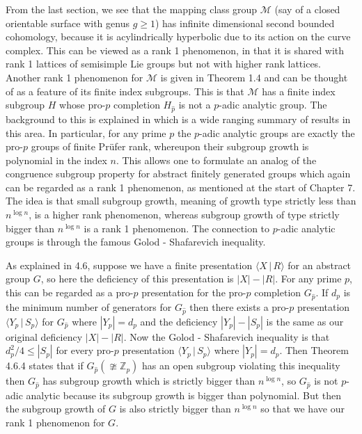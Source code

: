 \documentclass[11pt,reqno]{amsart}
\numberwithin{equation}{section}
\newcommand{\Z}{\mathbb{Z}}
\newcommand{\geqs}{\geqslant}
\theoremstyle{definition}
\theoremstyle{remark}
\begin{document}
   From the last section, we see that the mapping
   class group $\mathcal{M}$ (say of a closed orientable surface with genus
   $g\geqs 1$) has infinite dimensional
   second bounded cohomology, because it 
   is acylindrically hyperbolic due to its action on the
   curve complex. This can be viewed as a rank 1 phenomenon, in that it
   is shared with rank 1 lattices of semisimple Lie groups but not
   with higher rank lattices. Another rank 1 phenomenon for $\mathcal{M}$
   is given in \cite{flm} Theorem 1.4 and can be thought of as a feature
   of its finite index subgroups. This is that $\mathcal{M}$ has a finite
   index subgroup $H$ whose pro-$p$ completion $H_{\hat{p}}$ is not a
   $p$-adic analytic group. The background to this is
   explained in \cite{lssg} which is a wide ranging summary of results in this
   area. In particular, for any prime $p$ the $p$-adic analytic groups are
   exactly the pro-$p$ groups of finite Pr\"ufer
   rank, whereupon their subgroup
   growth is polynomial in the index $n$. This allows one to formulate
   an analog of the congruence subgroup property for abstract finitely
   generated groups which again can be regarded as a rank 1 phenomenon,
   as mentioned at the start of
   \cite{lssg} Chapter 7. The idea is that small subgroup
   growth, meaning of growth type strictly less than $n^{\log n}$, is a
   higher rank
   phenomenon, whereas subgroup growth of type strictly bigger than $n^{\log n}$
     is a rank 1 phenomenon. The connection to $p$-adic analytic groups
     is through the famous Golod - Shafarevich inequality.

     As explained in
     \cite{lssg} 4.6, suppose we have a finite presentation
     $\langle X\,|\,R\rangle$ for an abstract group $G$, so here the
     deficiency of this presentation is $|X|-|R|$. For any prime $p$,
     this can be regarded as a pro-$p$ presentation for the pro-$p$
     completion $G_{\hat{p}}$. If $d_p$ is the minimum number of generators
     for $G_{\hat{p}}$ then there exists a pro-$p$ presentation
     $\langle Y_p\,|\,S_p\rangle$ for $G_{\hat{p}}$ where $|Y_p|=d_p$ and the
     deficiency $|Y_p|-|S_p|$ is the same as our original deficiency
     $|X|-|R|$. Now the Golod - Shafarevich inequality is that
     $d_p^2/4\leq |S_p|$ for every pro-$p$ presentation
     $\langle Y_p\,|\,S_p\rangle$ where $|Y_p|=d_p$. Then \cite{lssg}
     Theorem 4.6.4 states that if $G_{\hat{p}}(\ncong\Z_p)$ has an open
     subgroup violating this inequality then $G_{\hat{p}}$ has subgroup
     growth which is strictly bigger than $n^{\log{n}}$, so $G_{\hat{p}}$ is
     not $p$-adic analytic because its subgroup growth is bigger than
     polynomial. But then the subgroup growth of $G$ is also 
     strictly bigger than $n^{\log n}$ so that we have our rank 1
     phenomenon for $G$.
\end{document}
